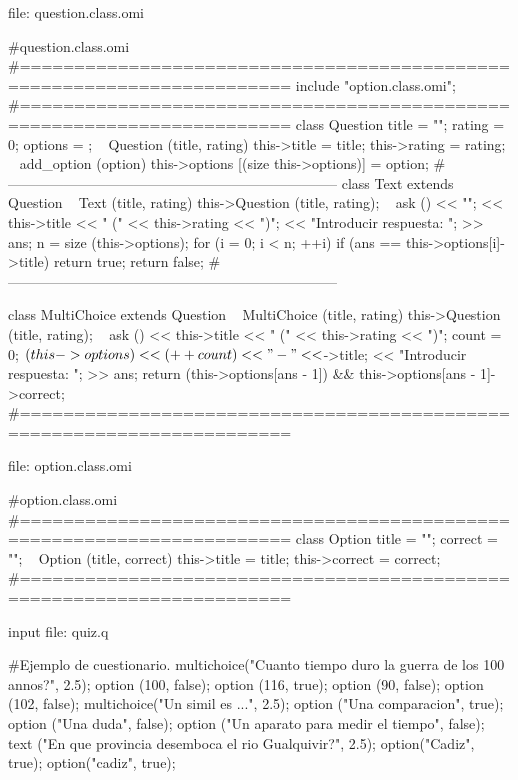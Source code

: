 file: question.class.omi
\begin{myverbatim}
#question.class.omi
#=======================================================================
include "option.class.omi";
#=======================================================================
class Question {
   title = "";
   rating = 0;
   options = {};
   ~ Question (title, rating) {
      this->title = title;
      this->rating = rating;
   }
   ~ add_option (option) {
      this->options [(size this->options)] = option;
   }
}
#-----------------------------------------------------------------------
class Text extends Question {
   ~ Text (title, rating) {
      this->Question (title, rating);
   }
   ~ ask () {
      << "";
      << this->title << " (" << this->rating << ")";
      << "Introducir respuesta: ";
      >> ans;
      n = size (this->options);
      for (i = 0; i < n; ++i) {
         if (ans == this->options[i]->title)
            return true;
      }
      return false;
   }
}
#-----------------------------------------------------------------------

class MultiChoice extends Question {
   ~ MultiChoice (title, rating) {
      this->Question (title, rating);
   }
   ~ ask () {
      << this->title << " (" << this->rating << ")";
      count = 0;
      $(this->options) <<  (++count) << " - " << $->title;
      << "Introducir respuesta: ";
      >> ans;
      return (this->options[ans - 1]) && this->options[ans - 1]->correct;
   }
}
#=======================================================================
\end{myverbatim}

file: option.class.omi
\begin{myverbatim}
#option.class.omi
#=======================================================================
class Option {
   title = "";
   correct = "";
   ~ Option (title, correct){
      this->title = title;
      this->correct = correct;
   }
}
#=======================================================================
\end{myverbatim}

input file: quiz.q
\begin{myverbatim}
#Ejemplo de cuestionario.
multichoice("Cuanto tiempo duro la guerra de los 100 annos?", 2.5);
option (100, false);
option (116, true);
option (90, false);
option (102, false);
multichoice("Un simil es ...", 2.5);
option ("Una comparacion", true);
option ("Una duda", false);
option ("Un aparato para medir el tiempo", false);
text ("En que provincia desemboca el rio Gualquivir?", 2.5);
option("Cadiz", true);
option("cadiz", true);
\end{myverbatim}

